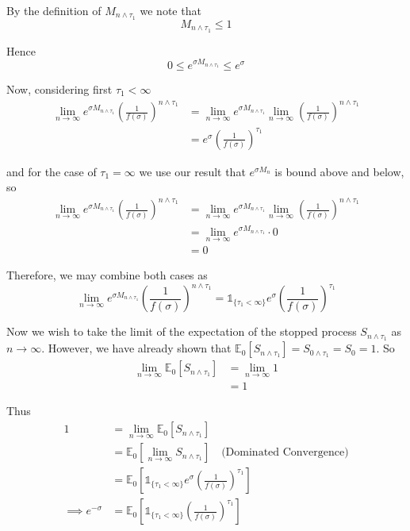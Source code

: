 \documentclass[12pt]{article}
\newlength\tindent
\renewcommand{\indent}{\hspace*{\tindent}}
\newcommand{\E}{\mathbb E}
\begin{document}
By the definition of $M_{n\land\tau_1}$ we note that
\begin{equation*}
	M_{n\land\tau_1} \leq 1
\end{equation*}

Hence
\begin{equation*}
	0 \leq e^{\sigma M_{n\land\tau_1}} \leq e^\sigma
\end{equation*}

Now, considering first $\tau_1 < \infty$
\begin{align*}
	\lim_{n\to\infty} e^{\sigma M_{n\land\tau_1}} \left( \frac{1}{f(\sigma)} \right)^{n\land\tau_1} &= \lim_{n\to\infty} e^{\sigma M_{n\land\tau_1}} \lim_{n\to\infty} \left( \frac{1}{f(\sigma)} \right)^{n\land\tau_1} \\
	&= e^\sigma \left( \frac{1}{f(\sigma)} \right)^{\tau_1}
\end{align*}

and for the case of $\tau_1 = \infty$ we use our result that $e^{\sigma M_n}$ is bound above and below, so
\begin{align*}
	\lim_{n\to\infty} e^{\sigma M_{n\land\tau_1}} \left( \frac{1}{f(\sigma)} \right)^{n\land\tau_1} &= \lim_{n\to\infty} e^{\sigma M_{n\land\tau_1}} \lim_{n\to\infty} \left( \frac{1}{f(\sigma)} \right)^{n\land\tau_1} \\
	&= \lim_{n\to\infty} e^{\sigma M_{n\land\tau_1}} \cdot 0 \\
	&= 0
\end{align*}

Therefore, we may combine both cases as
\begin{equation*}
\lim_{n\to\infty} e^{\sigma M_{n\land\tau_1}} \left( \frac{1}{f(\sigma)} \right)^{n\land\tau_1} = \mathds 1_{\{ \tau_1 < \infty \}} e^\sigma \left( \frac{1}{f(\sigma)} \right)^{\tau_1}
\end{equation*}

\indent Now we wish to take the limit of the expectation of the stopped process $S_{n\land\tau_1}$ as $n \to \infty$. However, we have already shown that $\E_0[S_{n\land\tau_1}] = S_{0 \land \tau_1} = S_0 = 1$. So
\begin{align*}
	\lim_{n\to\infty} \E_0[S_{n\land\tau_1}] &= \lim_{n\to\infty} 1 \\
	&= 1
\end{align*}

Thus
\begin{align*}
	1 &= \lim_{n\to\infty} \E_0 \left[ S_{n\land\tau_1} \right] \\
	&= \E_0 \left[ \lim_{n\to\infty} S_{n\land\tau_1} \right] \quad \text{(Dominated Convergence)} \\
	&= \E_0 \left[ \mathds 1_{\{ \tau_1 < \infty \}} e^\sigma \left( \frac{1}{f(\sigma)} \right)^{\tau_1} \right]  \\
	\implies e^{-\sigma} &= \E_0 \left[ \mathds 1_{\{ \tau_1 < \infty \}} \left( \frac{1}{f(\sigma)} \right)^{\tau_1} \right] 
\end{align*}
\end{document}
